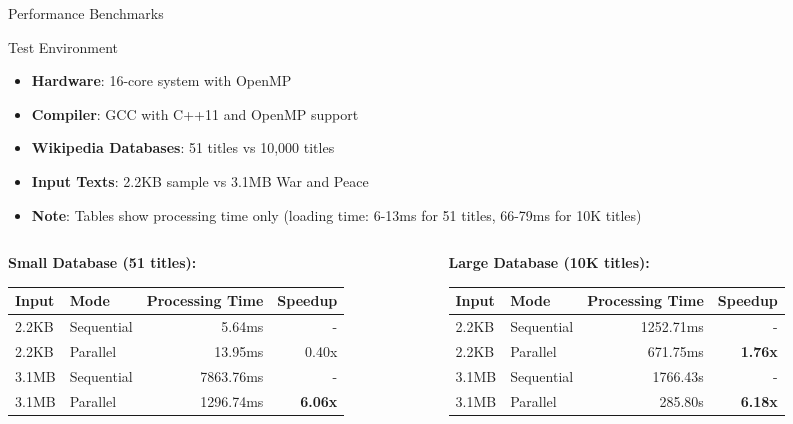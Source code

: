 \documentclass[aspectratio=169]{beamer}
\begin{document}
\begin{frame}{Performance Benchmarks}
\begin{block}{Test Environment}
\begin{itemize}
    \item \textbf{Hardware}: 16-core system with OpenMP
    \item \textbf{Compiler}: GCC with C++11 and OpenMP support
    \item \textbf{Wikipedia Databases}: 51 titles vs 10,000 titles
    \item \textbf{Input Texts}: 2.2KB sample vs 3.1MB War and Peace
    \item \textbf{Note}: Tables show processing time only (loading time: 6-13ms for 51 titles, 66-79ms for 10K titles)
\end{itemize}
\end{block}

\begin{columns}
\begin{column}{0.5\textwidth}
\textbf{Small Database (51 titles):}
\begin{table}[h]
\tiny
\begin{tabular}{|l|l|r|r|}
\hline
\textbf{Input} & \textbf{Mode} & \textbf{Processing Time} & \textbf{Speedup} \\
\hline
2.2KB & Sequential & 5.64ms & - \\
2.2KB & Parallel & 13.95ms & 0.40x \\
\hline
3.1MB & Sequential & 7863.76ms & - \\
3.1MB & Parallel & 1296.74ms & \textbf{6.06x} \\
\hline
\end{tabular}
\end{table}
\end{column}
\begin{column}{0.5\textwidth}
\textbf{Large Database (10K titles):}
\begin{table}[h]
\tiny
\begin{tabular}{|l|l|r|r|}
\hline
\textbf{Input} & \textbf{Mode} & \textbf{Processing Time} & \textbf{Speedup} \\
\hline
2.2KB & Sequential & 1252.71ms & - \\
2.2KB & Parallel & 671.75ms & \textbf{1.76x} \\
\hline
3.1MB & Sequential & 1766.43s & - \\
3.1MB & Parallel & 285.80s & \textbf{6.18x} \\
\hline
\end{tabular}
\end{table}
\end{column}
\end{columns}
\end{frame}
\end{document}
